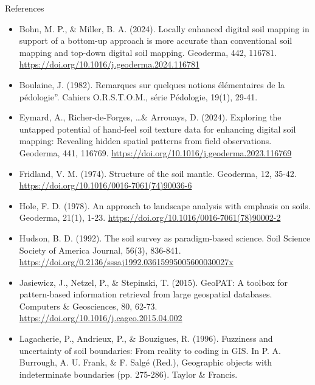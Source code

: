 \documentclass[aspectratio=169, 10pt]{beamer}
\begin{document}
\begin{frame}[allowframebreaks]{References}


  \begin{scriptsize}
\begin{itemize}

  \item Bohn, M. P., \& Miller, B. A. (2024). Locally enhanced digital soil mapping in support of a bottom-up approach is more accurate than conventional soil mapping and top-down digital soil mapping. Geoderma, 442, 116781. \url{https://doi.org/10.1016/j.geoderma.2024.116781}

    \item Boulaine, J. (1982). Remarques sur quelques notions élémentaires de la pédologie”. Cahiers O.R.S.T.O.M., série Pédologie, 19(1), 29-41.

      \item Eymard, A., Richer-de-Forges, \ldots \& Arrouays, D. (2024). Exploring the untapped potential of hand-feel soil texture data for enhancing digital soil mapping: Revealing hidden spatial patterns from field observations. Geoderma, 441, 116769. \url{https://doi.org/10.1016/j.geoderma.2023.116769}

    
    \item Fridland, V. M. (1974). Structure of the soil mantle. Geoderma, 12, 35-42. \url{https://doi.org/10.1016/0016-7061(74)90036-6}

    \item Hole, F. D. (1978). An approach to landscape analysis with emphasis on soils. Geoderma, 21(1), 1-23. \url{https://doi.org/10.1016/0016-7061(78)90002-2}

    \item Hudson, B. D. (1992). The soil survey as paradigm-based science. Soil Science Society of America Journal, 56(3), 836-841. \url{https://doi.org/0.2136/sssaj1992.03615995005600030027x}


    \item Jasiewicz, J., Netzel, P., \& Stepinski, T. (2015). GeoPAT: A toolbox for pattern-based information retrieval from large geospatial databases. Computers \& Geosciences, 80, 62-73. \url{https://doi.org/10.1016/j.cageo.2015.04.002}


    \item Lagacherie, P., Andrieux, P., \& Bouzigues, R. (1996). Fuzziness and uncertainty of soil boundaries: From reality to coding in GIS. In P. A. Burrough, A. U. Frank, \& F. Salgé (Red.), Geographic objects with indeterminate boundaries (pp. 275-286). Taylor \& Francis.


\end{itemize}
\end{scriptsize}
\end{frame}
\end{document}
